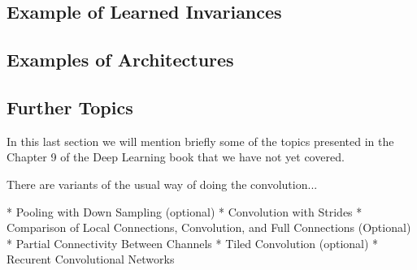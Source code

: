 \documentclass[]{article}
\begin{document}

\subsection{Example of Learned Invariances}


\subsection{Examples of Architectures}

\subsection{Further Topics}
In this last section we will mention briefly some of the topics presented in the
Chapter 9 of the Deep Learning book that we have not yet covered.

There are variants of the usual way of doing the convolution...

* Pooling with Down Sampling (optional)
* Convolution with Strides
* Comparison of Local Connections, Convolution, and Full Connections (Optional)
* Partial Connectivity Between Channels
* Tiled Convolution (optional)
* Recurent Convolutional Networks




\end{document}
